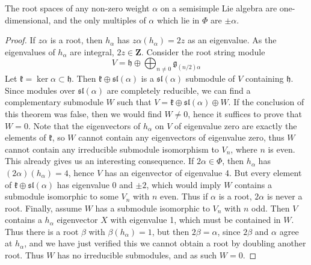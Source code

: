 \begin{theorem}
    The root spaces of any non-zero weight $\alpha$ on a semisimple Lie algebra are one-dimensional, and the only multiples of $\alpha$ which lie in $\Phi$ are $\pm \alpha$.
\end{theorem}
\begin{proof}
    If $z\alpha$ is a root, then $h_\alpha$ has $z\alpha(h_\alpha) = 2z$ as an eigenvalue. As the eigenvalues of $h_\alpha$ are integral, $2z \in \mathbf{Z}$. Consider the root string module
    \[ V = \mathfrak{h} \oplus \bigoplus_{n \neq 0} \mathfrak{g}_{(n/2)\alpha} \]
    Let $\mathfrak{k} = \ker \alpha \subset \mathfrak{h}$. Then $\mathfrak{k} \oplus \mathfrak{sl}(\alpha)$ is a $\mathfrak{sl}(\alpha)$ submodule of $V$ containing $\mathfrak{h}$. Since modules over $\mathfrak{sl}(\alpha)$ are completely reducible, we can find a complementary submodule $W$ such that $V = \mathfrak{k} \oplus \mathfrak{sl}(\alpha) \oplus W$. If the conclusion of this theorem was false, then we would find $W \neq 0$, hence it suffices to prove that $W = 0$. Note that the eigenvectors of $h_\alpha$ on $V$ of eigenvalue zero are exactly the elements of $\mathfrak{k}$, so $W$ cannot contain any eigenvectors of eigenvalue zero, thus $W$ cannot contain any irreducible submodule isomorphism to $V_n$, where $n$ is even. This already gives us an interesting consequence. If $2\alpha \in \Phi$, then $h_\alpha$ has $(2\alpha)(h_\alpha) = 4$, hence $V$ has an eigenvector of eigenvalue 4. But every element of $\mathfrak{k} \oplus \mathfrak{sl}(\alpha)$ has eigenvalue $0$ and $\pm 2$, which would imply $W$ contains a submodule isomorphic to some $V_n$ with $n$ even. Thus if $\alpha$ is a root, $2 \alpha$ is never a root. Finally, assume $W$ has a submodule isomorphic to $V_n$ with $n$ odd. Then $V$ contains a $h_\alpha$ eigenvector $X$ with eigenvalue 1, which must be contained in $W$. Thus there is a root $\beta$ with $\beta(h_\alpha) = 1$, but then $2\beta = \alpha$, since $2\beta$ and $\alpha$ agree at $h_\alpha$, and we have just verified this we cannot obtain a root by doubling another root. Thus $W$ has no irreducible submodules, and as such $W = 0$.
\end{proof}

